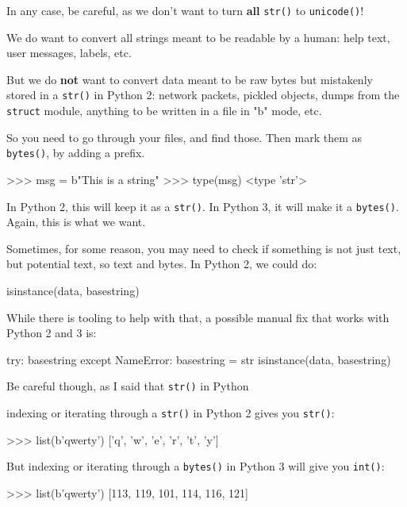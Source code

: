 In any case, be careful, as we don't want to turn  \textbf{all} \lstinline{str()} to \lstinline{unicode()}!

We do want to convert all strings meant to be readable by a human: help text, user messages, labels, etc.

But we do \textbf{not} want to convert data meant to be raw bytes but mistakenly stored in a \lstinline{str()} in Python 2: network packets, pickled objects, dumps from the \lstinline{struct} module, anything to be written in a file in "b" mode, etc.

So you need to go through your files, and find those. Then mark them as \lstinline{bytes()}, by adding a  prefix.

\begin{py2}
>>> msg = b"This is a string"
>>> type(msg)
<type 'str'>
\end{py2}

In Python 2, this will keep it as a \lstinline{str()}. In Python 3, it will make it a \lstinline{bytes()}. Again, this is what we want.

Sometimes, for some reason, you may need to check if something is not just text, but potential text, so text and bytes. In Python 2, we could do:

\begin{py2}
isinstance(data, basestring)
\end{py2}

While there is tooling to help with that, a possible manual fix that works with Python 2 and 3 is:

\begin{py2and3}
try:
  basestring
except NameError:
  basestring = str
isinstance(data, basestring)
\end{py2and3}

Be careful though, as I said that \lstinline{str()} in Python

indexing or iterating through a \lstinline{str()} in Python 2 gives you \lstinline{str()}:

\begin{py2}
>>> list(b'qwerty')
['q', 'w', 'e', 'r', 't', 'y']
\end{py2}

But indexing or iterating through a \lstinline{bytes()} in Python 3 will give you \lstinline{int()}:

\begin{py2}
>>> list(b'qwerty')
[113, 119, 101, 114, 116, 121]
\end{py2}

